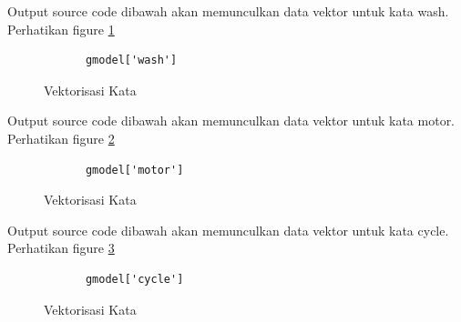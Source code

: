 \begin{enumerate}
Output source code dibawah akan memunculkan data vektor untuk kata wash. Perhatikan figure \ref{YNC5-14}

		\begin{verbatim}
			gmodel['wash']
		\end{verbatim}

		\begin{figure}[ht]
			\caption{Vektorisasi Kata}
			\label{YNC5-14}
		\end{figure}
Output source code dibawah akan memunculkan data vektor untuk kata motor. Perhatikan figure \ref{YNC5-15}

		\begin{verbatim}
			gmodel['motor']
		\end{verbatim}

		\begin{figure}[ht]
			\caption{Vektorisasi Kata}
			\label{YNC5-15}
		\end{figure}

Output source code dibawah akan memunculkan data vektor untuk kata cycle. Perhatikan figure \ref{YNC5-16}

		\begin{verbatim}
			gmodel['cycle']
		\end{verbatim}

		\begin{figure}[ht]
			\caption{Vektorisasi Kata}
			\label{YNC5-16}
		\end{figure}


\end{enumerate}
